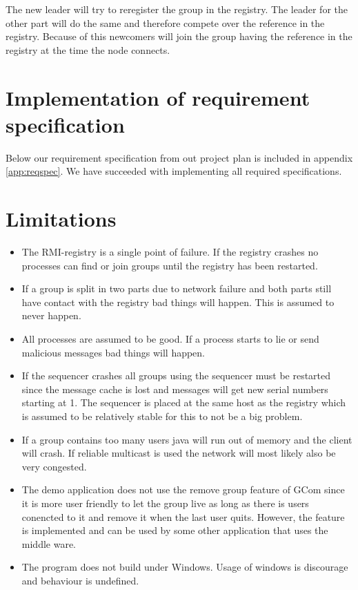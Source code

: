 \documentclass[english]{article}
\begin{document}
The new leader will try to reregister the group in the registry. The leader for the other part will do the same and therefore compete over the reference in the registry. Because of this newcomers will join the group having the reference in the registry at the time the node connects.

\section{Implementation of requirement specification}
Below our requirement specification from out project plan is included in appendix \vref{app:reqspec}. We have succeeded with implementing all required specifications. 

\section{Limitations}
\begin{itemize}
\item The RMI-registry is a single point of failure. If the registry crashes no processes can find or join groups until the registry has been restarted.

\item If a group is split in two parts due to network failure and both parts still have contact with the registry bad things will happen. This is assumed to never happen.

\item All processes are assumed to be good. If a process starts to lie or send malicious messages bad things will happen.

\item If the sequencer crashes all groups using the sequencer must be restarted since the message cache is lost and messages will get new serial numbers starting at 1. The sequencer is placed at the same host as the registry which is assumed to be relatively stable for this to not be a big problem.

\item If a group contains too many users java will run out of memory and the client will crash. If reliable multicast is used the network will most likely also be very congested.

\item The demo application does not use the remove group feature of GCom since it is more user friendly to let the group live as long as there is users conencted to it and remove it when the last user quits. However, the feature is implemented and can be used by some other application that uses the middle ware.

\item The program does not build under Windows. Usage of windows is discourage and behaviour is undefined.

\end{itemize}
\end{document}
